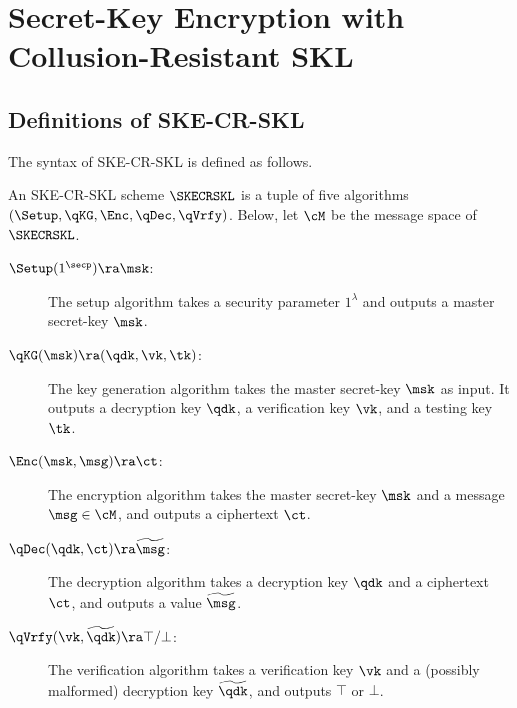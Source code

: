 

\section{Secret-Key Encryption with Collusion-Resistant SKL}

\subsection{Definitions of SKE-CR-SKL}
The syntax of SKE-CR-SKL is defined as follows. 
\begin{definition}
    An SKE-CR-SKL scheme $\SKECRSKL$ is a tuple of five algorithms
$(\Setup,\qKG, \Enc, \qDec, \qVrfy)$. 
Below, let $\cM$  be the message space of $\SKECRSKL$. 
\begin{description}
\item[$\Setup(1^\secp)\ra\msk$:] The setup algorithm takes a
security parameter $1^\lambda$ and outputs a master secret-key
$\msk$.

\item[$\qKG(\msk)\ra(\qdk,\vk,\tk)$:] The key generation algorithm
takes the master secret-key $\msk$ as input. It outputs a decryption
key $\qdk$, a verification key $\vk$, and a testing key
$\tk$.

\item[$\Enc(\msk,\msg)\ra\ct$:] The encryption algorithm takes the
master secret-key $\msk$ and a message $\msg \in \cM$, and outputs a
ciphertext $\ct$.

\item[$\qDec(\qdk,\ct)\ra\widetilde{\msg}$:] The decryption
algorithm takes a decryption key $\qdk$ and a ciphertext $\ct$,
and outputs a value $\widetilde{\msg}$.


\item[$\qVrfy(\vk, \widetilde{\qdk})\ra\top/\bot$:] The verification
    algorithm takes a verification key $\vk$ and a (possibly
    malformed) decryption key $\widetilde{\qdk}$,
and outputs $\top$ or $\bot$.



\end{description}
\end{definition}
